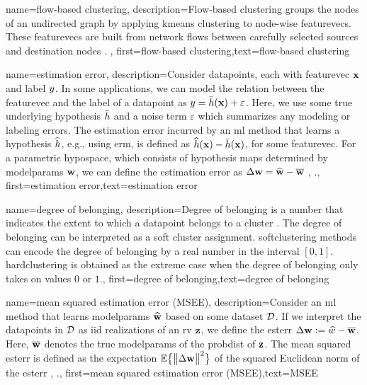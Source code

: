 {name={flow-based clustering},
	description={Flow-based \gls{clustering} groups the nodes 
		of an undirected \gls{graph} by applying \gls{kmeans} \gls{clustering} to node-wise 
		\gls{featurevec}s. These \gls{featurevec}s are built from network flows between 
		carefully selected sources and destination nodes \cite{FlowSpecClustering2021}. }, 
	first={flow-based clustering},text={flow-based clustering} 
}



{name={estimation error},
	description={Consider \gls{datapoint}s, each with \gls{featurevec} ${\bf x}$ and \gls{label} 
		$y$. In some applications, we can model the relation between the \gls{featurevec} and the \gls{label}
		of a \gls{datapoint} as $y = \bar{h}({\bf x}) + \varepsilon$. Here, we 
		use some true underlying \gls{hypothesis} $\bar{h}$ and a noise term $\varepsilon$ 
		which summarizes any modeling or labeling errors. The estimation error incurred by an \gls{ml} 
		method that learns a \gls{hypothesis} $\widehat{h}$, e.g., using \gls{erm}, is defined as 
		$\widehat{h}({\bf x}) - \bar{h}({\bf x})$, for some \gls{featurevec}. 
		For a parametric \gls{hypospace}, which consists of \gls{hypothesis} maps determined by 
		\gls{modelparams} ${\bf w}$, we can define the estimation error as $\Delta {\bf w} = \widehat{{\bf w}} - \overline{{\bf w}}$ \cite{kay}, \cite{hastie01statisticallearning}.},
	first={estimation error},text={estimation error} 
}


{name={degree of belonging},
	description={Degree of belonging is a number that indicates the extent to which a \gls{datapoint} 
		belongs to a \gls{cluster} \cite[Ch. 8]{MLBasics}. The degree of belonging can be 
		interpreted as a soft \gls{cluster} assignment. \Gls{softclustering} methods can 
		encode the degree of belonging by a real number in the interval $[0,1]$. 
		\Gls{hardclustering} is obtained as the extreme case when the degree of belonging 
		only takes on values $0$ or $1$.}, first={degree of belonging},text={degree of belonging} 
}

{name={mean squared estimation error (MSEE)},
	description={Consider an \gls{ml} method that 
		learns \gls{modelparams} $\widehat{{\bf w}}$ based on some \gls{dataset} $\mathcal{D}$. 
		If we interpret the \gls{datapoint}s in $\mathcal{D}$ as \gls{iid} \gls{realization}s of an \gls{rv} ${\bf z}$, 
		we define the \gls{esterr} $\Delta {\bf w} := \widehat{w} - \overline{{\bf w}}$. 
		Here, $\overline{{\bf w}}$ denotes the true \gls{modelparams} of the \gls{probdist} 
		of ${\bf z}$. The \gls{mean} squared \gls{esterr} is 
		defined as the \gls{expectation} $\mathbb{E} \big\{ \big\| \Delta {\bf w} \big\|^{2} \big\}$ of the 
		squared Euclidean \gls{norm} of the \gls{esterr} \cite{LC}, \cite{kay}.},
	first={mean squared estimation error (MSEE)},text={MSEE} 
}


